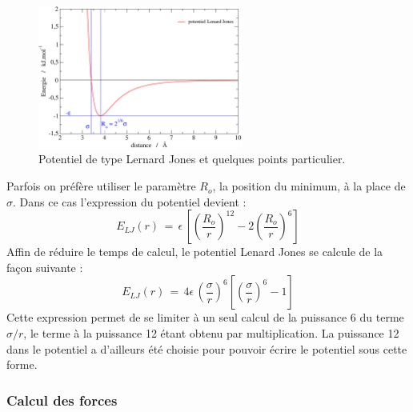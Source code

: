 \documentclass[11pt,a4paper,fleqn]{book}
\begin{document}
\begin{figure}[htb]
	\begin{center}
		\includegraphics[width=0.6\textwidth]{potLJ}
	\end{center}
	\caption{Potentiel de type Lernard Jones et quelques points particulier.}
	\label{fig_potLJ}
\end{figure}

Parfois on préfère utiliser le paramètre $R_o$, la position du minimum, à la
place de $\sigma$. Dans ce cas l'expression du potentiel devient :
%
\begin{equation}
	E_{LJ}(r) \, = \, \epsilon \, \left[ \left(\frac{R_o}{r}\right)^{12} 
		- 2 \left(\frac{R_o}{r}\right)^6 \right]
\end{equation}
%
Affin de réduire le temps de calcul, le potentiel
Lenard Jones se calcule de la façon suivante :
%
\begin{equation*}
	E_{LJ}(r) \, = \, 4 \epsilon \, \left(\frac{\sigma}{r}\right)^6 
		\left[\left(\frac{\sigma}{r}\right)^6 - 1 \right]
\end{equation*}
%
Cette expression permet de se limiter à un seul calcul de la puissance 6 
du terme $\sigma/r$, le terme à la puissance 12 étant obtenu par multiplication.
La puissance 12 dans le potentiel a d'ailleurs été choisie
pour pouvoir écrire le potentiel sous cette forme.

\subsubsection{Calcul des forces}
\end{document}
